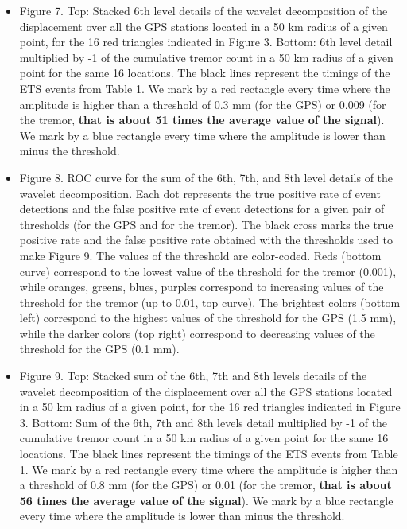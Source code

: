 \documentclass{article}
\begin{document}
\begin{itemize}
\item Figure 7. Top: Stacked 6th level details of the wavelet decomposition of the displacement over all the GPS stations located in a 50 km radius of a given point, for the 16 red triangles indicated in Figure 3. Bottom: 6th level detail multiplied by -1 of the cumulative tremor count in a 50 km radius of a given point for the same 16 locations. The black lines represent the timings of the ETS events from Table 1. We mark by a red rectangle every time where the amplitude is higher than a threshold of 0.3 mm (for the GPS) or 0.009 (for the tremor, \textbf{that is about 51 times the average value of the signal}). We mark by a blue rectangle every time where the amplitude is lower than minus the threshold.

\item Figure 8. ROC curve for the sum of the 6th, 7th, and 8th level details of the wavelet decomposition. Each dot represents the true positive rate of event detections and the false positive rate of event detections for a given pair of thresholds (for the GPS and for the tremor). The black cross marks the true positive rate and the false positive rate obtained with the thresholds used to make Figure 9. The values of the threshold are color-coded. Reds (bottom curve) correspond to the lowest value of the threshold for the tremor (0.001), while oranges, greens, blues, purples correspond to increasing values of the threshold for the tremor (up to 0.01, top curve). The brightest colors (bottom left) correspond to the highest values of the threshold for the GPS (1.5 mm), while the darker colors (top right) correspond to decreasing values of the threshold for the GPS (0.1 mm).

\item Figure 9. Top: Stacked sum of the 6th, 7th and 8th levels details of the wavelet decomposition of the displacement over all the GPS stations located in a 50 km radius of a given point, for the 16 red triangles indicated in Figure 3. Bottom: Sum of the 6th, 7th and 8th levels detail multiplied by -1 of the cumulative tremor count in a 50 km radius of a given point for the same 16 locations. The black lines represent the timings of the ETS events from Table 1. We mark by a red rectangle every time where the amplitude is higher than a threshold of 0.8 mm (for the GPS) or 0.01 (for the tremor, \textbf{that is about 56 times the average value of the signal}). We mark by a blue rectangle every time where the amplitude is lower than minus the threshold.


\end{itemize}
\end{document}
